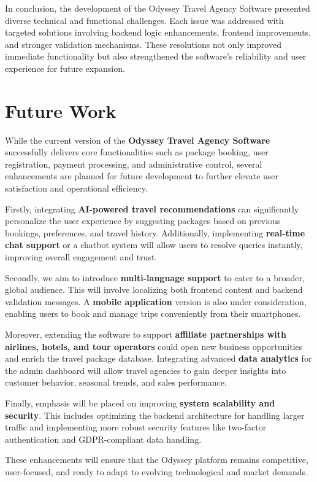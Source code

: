 \noindent In conclusion, the development of the Odyssey Travel Agency Software presented diverse technical and functional challenges. Each issue was addressed with targeted solutions involving backend logic enhancements, frontend improvements, and stronger validation mechanisms. These resolutions not only improved immediate functionality but also strengthened the software's reliability and user experience for future expansion.


\section{Future Work}
While the current version of the \textbf{Odyssey Travel Agency Software} successfully delivers core functionalities such as package booking, user registration, payment processing, and administrative control, several enhancements are planned for future development to further elevate user satisfaction and operational efficiency.

Firstly, integrating \textbf{AI-powered travel recommendations} can significantly personalize the user experience by suggesting packages based on previous bookings, preferences, and travel history. Additionally, implementing \textbf{real-time chat support} or a chatbot system will allow users to resolve queries instantly, improving overall engagement and trust.

Secondly, we aim to introduce \textbf{multi-language support} to cater to a broader, global audience. This will involve localizing both frontend content and backend validation messages. A \textbf{mobile application} version is also under consideration, enabling users to book and manage trips conveniently from their smartphones.

Moreover, extending the software to support \textbf{affiliate partnerships with airlines, hotels, and tour operators} could open new business opportunities and enrich the travel package database. Integrating advanced \textbf{data analytics} for the admin dashboard will allow travel agencies to gain deeper insights into customer behavior, seasonal trends, and sales performance.

Finally, emphasis will be placed on improving \textbf{system scalability and security}. This includes optimizing the backend architecture for handling larger traffic and implementing more robust security features like two-factor authentication and GDPR-compliant data handling.

These enhancements will ensure that the Odyssey platform remains competitive, user-focused, and ready to adapt to evolving technological and market demands.

